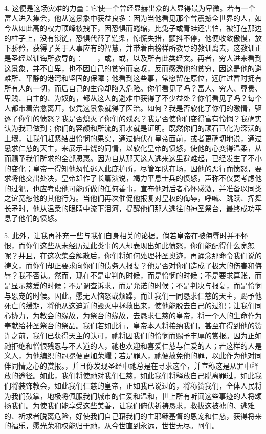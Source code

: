 4. 这便是这场灾难的力量：它使一个曾经显赫出众的人显得最为卑微。若有一个富人进入集会，他从这景象中获益良多：因为当他看见那个曾震撼全世界的人，如今从如此高的权力顶峰被拽下，因恐惧而蜷缩，比兔子或青蛙还害怕，被钉在那边的柱子上，没有锁链，恐惧代替了链条，惊慌失措，颤抖不停，他便收敛傲慢，放下骄矜，获得了关于人事应有的智慧，并带着由榜样所教导的教训离去，这教训正是圣经以训诲所教导的：——，或，或，以及所有此类经文。再者，穷人进来看到这景象，并不自卑，也不因自己的贫穷而哀叹，反而感激他的贫穷，因这是他的避难所、平静的港湾和坚固的保障；他看到这些事，常愿留在原位，远胜过暂时拥有所有人的一切，而后自己的生命却陷入危险。你们看见了吗？富人、穷人、尊贵、卑贱、自主的、为奴的，都从这人的避难中获得了不少益处？你们看见了吗？每个人都带着治愈离开，仅凭这景象就得了医治。如何？我是否软化了你们的激情，驱逐了你们的愤怒？我是否熄灭了你们的残忍？我是否使你们变得富有怜悯？我确实认为我已做到；你们的容颜和所流的泪水就是证明。既然你们的顽石已化为深沃的土壤，让我们赶紧结出怜悯的果实，通过俯伏在皇帝面前，或者更确切地说，通过恳求仁慈的天主，来展示丰饶的同情，以软化皇帝的愤怒，使他的心变得温柔，从而赐予我们所求的全部恩惠。因为自从那天这人逃来这里避难起，已经发生了不小的变化；皇帝一得知他匆忙逃入此庇护所，尽管军队在场，因他的恶行而愤怒，要求将他交出处决，皇帝却作了长篇演说，竭力平息士兵的愤怒，声称不仅要考虑他的过犯，也应考虑他可能所做的任何善事，宣布他对后者心怀感激，并准备以同类之谊宽恕他的其他行为。当他们再次催促他报复对皇权的侮辱，呼喊、跳跃、挥舞长矛时，他从温柔的眼睛中流下泪河，提醒他们那人逃往的神圣祭台，最终成功平息了他们的愤怒。\par

5. 此外，让我再补充一些与我们自身相关的论据。倘若皇帝在被侮辱时并不怀恨，而你们这些从未经历过此类事的人却表现出如此愤怒，你们能配得什么宽恕呢？并且，在这次集会解散后，你们将如何处理神圣奥迹，再诵念那命令我们说的祷文，而你们却正要求向你们的债务人报复？他是否对你们造成了极大的伤害和侮辱？我不否认。然而，现在不是审判的时候，而是怜悯的时候；不是要求算账，而是显示慈爱的时候；不是调查诉求，而是允诺的时候；不是判决与报复，而是怜悯与恩宠的时候。因此，愿无人恼怒或烦躁，而让我们一同恳求仁慈的天主，赐予他死亡的缓期，将他从这迫近的毁灭中拯救出来，使他能脱去自己的过犯；让我们同心协力，为教会的缘故，为祭台的缘故，去恳求仁慈的皇帝，将一个人的生命作为奉献给神圣祭台的祭品。我们若如此行，皇帝本人将接纳我们，甚至在得到他的赞许之前，我们已获得天主的认可，祂将因我们的怜悯而赐予丰厚的赏报。因为正如祂拒绝和憎恨残忍与不人道的人，祂也欢迎和喜爱仁慈与仁爱的人；若这样的人是义人，为他编织的冠冕便更加荣耀；若是罪人，祂便赦免他的罪，以此作为他对同伴同情之心的赏报。，并且你发现圣经中祂总是在寻求这个，并宣称这是从罪中释放的途径。如此，我们将使祂对我们仁慈，如此我们将释放自己脱离罪过，如此我们将装饰教会，如此我们仁慈的皇帝，正如我已说过的，将称赞我们，全体人民将为我们鼓掌，地极将佩服我们城市的仁爱和温和，世上所有听闻这些事迹的人将颂扬我们。为使我们能享受这些美善，让我们俯伏祈祷恳求，救拔这被掳的、逃难的、祈求者脱离危险，好使我们自己藉我们的主耶稣基督的恩宠和仁慈，获得将来的福乐，愿光荣和权能归于祂，从今世直到永远，世世无尽。阿们。\par

